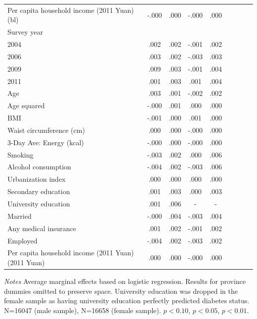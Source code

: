 \begin{table}[p]
\begin{center}
\begin{adjustbox}{max width=\linewidth}
\begin{threeparttable}
{\begin{tabular}{l*{4}{S S}}
Per capita household income (2011 Yuan) (bl)&-.000 &.000         &-.000 &.000         \\
Survey year && \\
\hspace*{10mm}2004&.002 &.002         &-.001 &.002         \\
\hspace*{10mm}2006&.003 &.002         &-.003 &.003         \\
\hspace*{10mm}2009&.009\sym{***} &.003         &-.001 &.004         \\
\hspace*{10mm}2011&.001 &.003         &.001 &.004         \\
Age           &.003\sym{**} &.001         &-.002 &.002         \\
Age squared        &-.000\sym{**} &.001         &.000 &.000         \\
BMI          &-.001 &.000        &.001\sym{**} &.000         \\
Waist circumference (cm)         &.000 &.000         &-.000 &.000         \\
3-Day Ave: Energy (kcal)        &-.000 &.000         &-.000 &.000         \\
Smoking         &-.003 &.002         &.000 &.006         \\
Alcohol consumption        &-.004\sym{**} &.002         &-.003 &.006         \\
Urbanization index         &.000 &.000         &.000 &.000         \\
Secondary education     &.001 &.003         &.000 &.003         \\
University education    &.001 &.006         & - & -         \\
Married       &-.000 &.004         &-.003 &.004         \\
Any medical insurance     &.001 &.002         &-.001 &.002         \\
Employed         &-.004\sym{**} &.002         &-.003 &.002         \\
Per capita household income (2011 Yuan) (2011 Yuan) &.000 &.000         &-.000 &.000         \\
\bottomrule
\end{tabular}
\begin{tablenotes}
\item \footnotesize \textit{Notes} Average marginal effects based on logistic regression. Results for province dummies omitted to preserve space. University education was dropped in the female sample as having university education perfectly predicted diabetes status. N=16047 (male sample), N=16658 (female sample). \sym{*} \(p<0.10\), \sym{**} \(p<0.05\), \sym{***} \(p<0.01\). \\
\end{tablenotes}
}
\end{threeparttable}

\end{adjustbox}
\end{center}
\end{table}
